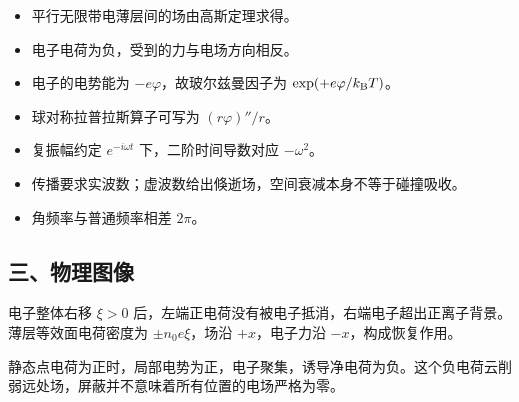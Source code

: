 \documentclass[12pt,a4paper,fontset=fandol]{ctexart}
\providecommand{\tightlist}{\setlength{\itemsep}{0pt}\setlength{\parskip}{0pt}}
\begin{document}
\begin{itemize}
\tightlist
\item
  平行无限带电薄层间的场由高斯定理求得。
\item
  电子电荷为负，受到的力与电场方向相反。
\item
  电子的电势能为 \(-e\varphi\)，故玻尔兹曼因子为
  \(\exp(+e\varphi/k_{\rm B}T)\)。
\item
  球对称拉普拉斯算子可写为 \((r\varphi)''/r\)。
\item
  复振幅约定 \(e^{-i\omega t}\) 下，二阶时间导数对应 \(-\omega^2\)。
\item
  传播要求实波数；虚波数给出倏逝场，空间衰减本身不等于碰撞吸收。
\item
  角频率与普通频率相差 \(2\pi\)。
\end{itemize}

\subsection{三、物理图像}\label{ux4e09ux7269ux7406ux56feux50cf-5}

电子整体右移 \(\xi>0\)
后，左端正电荷没有被电子抵消，右端电子超出正离子背景。薄层等效面电荷密度为
\(\pm n_0e\xi\)，场沿 \(+x\)，电子力沿 \(-x\)，构成恢复作用。

静态点电荷为正时，局部电势为正，电子聚集，诱导净电荷为负。这个负电荷云削弱远处场，屏蔽并不意味着所有位置的电场严格为零。

\begin{center}
\begin{minipage}{\linewidth}
\centering\begingroup
{}
\ifdim\wd\diagrambox>.88\linewidth
\sbox{\diagrambox}{\resizebox{.88\linewidth}{!}{\usebox{\diagrambox}}}
\fi
\ifdim\ht\diagrambox>.29\textheight
\resizebox{!}{.29\textheight}{\usebox{\diagrambox}}
\else\usebox{\diagrambox}\fi
\par{}
\endgroup\end{minipage}
\end{center}
\end{document}
